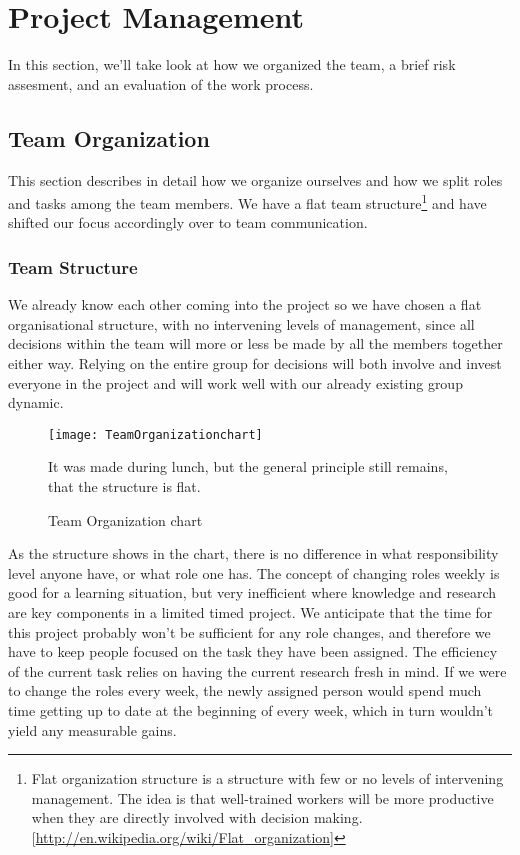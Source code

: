 \section{Project Management}\label{Project Management} 
    In this section, we'll take look at how we organized the team, a brief risk assesment, and an evaluation of the work process. 
    
    \subsection{Team Organization}\label{Team Organization} 
        This section describes in detail how we organize ourselves and how we split roles and tasks among the team members. We have a flat team structure\footnote{Flat organization structure is a structure with few or no levels of intervening management. The idea is that well-trained workers will be more productive when they are directly involved with decision making. [\url{http://en.wikipedia.org/wiki/Flat_organization}]}  and have shifted our focus accordingly over to team communication. 
    
    \subsubsection{Team Structure}\label{Team Structure}
    We already know each other coming into the project so we have chosen a flat organisational structure, with no intervening levels of management, since all decisions within the team will more or less be made by all the members together either way. Relying on the entire group for decisions will both involve and invest everyone in the project and will work well with our already existing group dynamic.

    \begin{figure}[h]
        \centering
        \texttt{[image: TeamOrganizationchart]}
        \caption{Team Organization chart}
        It was made during lunch, but the general principle still remains, that the structure is flat.
        \label{fig:TeamOrganizationchart}
    \end{figure}
    
    As the structure shows in the chart, there is no difference in what responsibility level anyone have, or what role one has. The concept of changing roles weekly is good for a learning situation, but very inefficient where knowledge and research are key components in a limited timed project. We anticipate that the time for this project probably won't be sufficient for any role changes, and therefore we have to keep people focused on the task they have been assigned. The efficiency of the current task relies on having the current research fresh in mind. If we were to change the roles every week, the newly assigned person would spend much time getting up to date at the beginning of every week, which in turn wouldn't yield any measurable gains. 
    
